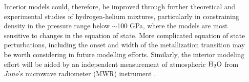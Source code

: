 Interior models could, therefore, be improved through further theoretical and
experimental studies of hydrogen-helium mixtures, particularly in constraining
density in the pressure range below $\sim$100 GPa, where the models are most
sensitive to changes in the equation of state. More complicated equation of state
perturbations, including the onset and width of the metallization transition
\citep{Knudson2017} may be worth considering in future modelling efforts.
Similarly, the interior modeling effort will be aided by an independent
measurement of atmospheric ${\rm H}_2{\rm O}$ from \textit{Juno}'s microwave
radiometer (MWR) instrument \citep{helled2014b}.







